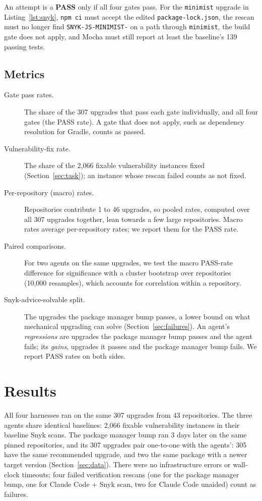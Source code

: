 \documentclass[11pt]{article}
\theoremstyle{definition}
\newcommand{\aided}{Claude Code + Snyk scan}
\newcommand{\unaided}{Claude Code unaided}
\newcommand{\pmbump}{package manager bump}
\begin{document}
An attempt is a \textbf{PASS} only if all four gates pass. For the \texttt{minimist} upgrade in Listing~\ref{lst:snyk}, \texttt{npm ci} must accept the edited \texttt{package-lock.json}, the rescan must no longer find \texttt{SNYK-JS-\allowbreak MINIMIST-} on a path through \texttt{minimist}, the build gate does not apply, and Mocha must still report at least the baseline's 139 passing tests.

\subsection{Metrics}
\label{sec:metrics}

\begin{description}
  \item[Gate pass rates.] The share of the 307 upgrades that pass each gate individually, and all four gates (the PASS rate). A gate that does not apply, such as dependency resolution for Gradle, counts as passed.
  \item[Vulnerability-fix rate.] The share of the 2{,}066 fixable vulnerability instances fixed (Section~\ref{sec:task}); an instance whose rescan failed counts as not fixed.
  \item[Per-repository (macro) rates.] Repositories contribute 1 to 46 upgrades, so pooled rates, computed over all 307 upgrades together, lean towards a few large repositories. Macro rates average per-repository rates; we report them for the PASS rate.
  \item[Paired comparisons.] For two agents on the same upgrades, we test the macro PASS-rate difference for significance with a cluster bootstrap over repositories~\cite{efron1993bootstrap,davison1997bootstrap} (10{,}000 resamples), which accounts for correlation within a repository.
  \item[Snyk-advice-solvable split.] The upgrades the \pmbump{} passes, a lower bound on what mechanical upgrading can solve (Section~\ref{sec:failures}). An agent's \emph{regressions} are upgrades the \pmbump{} passes and the agent fails; its \emph{gains}, upgrades it passes and the \pmbump{} fails. We report PASS rates on both sides.
\end{description}

\section{Results}
\label{sec:results}

All four harnesses ran on the same 307 upgrades from 43 repositories. The three agents share identical baselines: 2{,}066 fixable vulnerability instances in their baseline Snyk scans. The \pmbump{} ran 3 days later on the same pinned repositories, and its 307 upgrades pair one-to-one with the agents': 305 have the same recommended upgrade, and two the same package with a newer target version (Section~\ref{sec:data}). There were no infrastructure errors or wall-clock timeouts; four failed verification rescans (one for the \pmbump{}, one for \aided{}, two for \unaided{}) count as failures.
\end{document}
